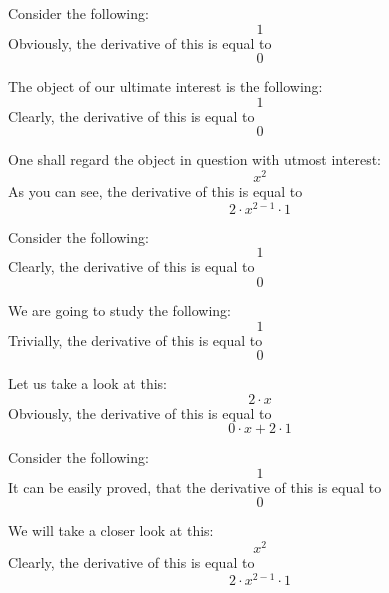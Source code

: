 \documentclass{article}
\begin{document}
Consider the following:
\begin{equation}
1 
\end{equation}
Obviously, the derivative of this is equal to
\begin{equation}
0 
\end{equation}

The object of our ultimate interest is the following:
\begin{equation}
1 
\end{equation}
Clearly, the derivative of this is equal to
\begin{equation}
0 
\end{equation}

One shall regard the object in question with utmost interest:
\begin{equation}
x ^{2 } 
\end{equation}
As you can see, the derivative of this is equal to
\begin{equation}
2 \cdot x ^{2 - 1 } \cdot 1 
\end{equation}

Consider the following:
\begin{equation}
1 
\end{equation}
Clearly, the derivative of this is equal to
\begin{equation}
0 
\end{equation}

We are going to study the following:
\begin{equation}
1 
\end{equation}
Trivially, the derivative of this is equal to
\begin{equation}
0 
\end{equation}

Let us take a look at this:
\begin{equation}
2 \cdot x 
\end{equation}
Obviously, the derivative of this is equal to
\begin{equation}
0 \cdot x + 2 \cdot 1 
\end{equation}

Consider the following:
\begin{equation}
1 
\end{equation}
It can be easily proved, that the derivative of this is equal to
\begin{equation}
0 
\end{equation}

We will take a closer look at this:
\begin{equation}
x ^{2 } 
\end{equation}
Clearly, the derivative of this is equal to
\begin{equation}
2 \cdot x ^{2 - 1 } \cdot 1 
\end{equation}
\end{document}
